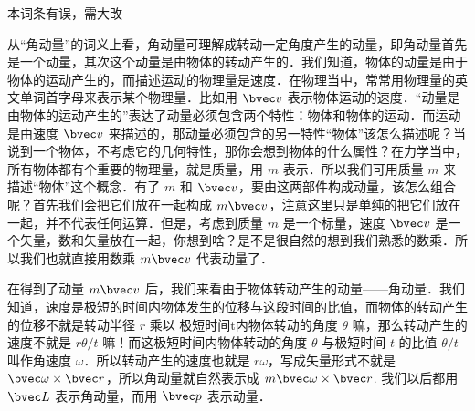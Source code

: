 
\begin{issues}
本词条有误，需大改
\end{issues}

从“角动量”的词义上看，角动量可理解成转动一定角度产生的动量，即角动量首先是一个动量，其次这个动量是由物体的转动产生的．我们知道，物体的动量是由于物体的运动产生的，而描述运动的物理量是速度．在物理当中，常常用物理量的英文单词首字母来表示某个物理量．比如用 $\bvec v$ 表示物体运动的速度．“动量是由物体的运动产生的”表达了动量必须包含两个特性：物体和物体的运动．而运动是由速度 $\bvec v$ 来描述的，那动量必须包含的另一特性“物体”该怎么描述呢？当说到一个物体，不考虑它的几何特性，那你会想到物体的什么属性？在力学当中，所有物体都有个重要的物理量，就是质量，用 $m$ 表示．所以我们可用质量 $m$ 来描述“物体”这个概念．有了 $m$ 和 $\bvec v$，要由这两部件构成动量，该怎么组合呢？首先我们会把它们放在一起构成 $m\bvec v$，注意这里只是单纯的把它们放在一起，并不代表任何运算．但是，考虑到质量 $m$ 是一个标量，速度 $\bvec v$ 是一个矢量，数和矢量放在一起，你想到啥？是不是很自然的想到我们熟悉的数乘．所以我们也就直接用数乘 $m\bvec v$ 代表动量了．

在得到了动量 $m\bvec v$ 后，我们来看由于物体转动产生的动量——角动量．我们知道，速度是极短的时间内物体发生的位移与这段时间的比值，而物体的转动产生的位移不就是转动半径 $r$ 乘以 极短时间t内物体转动的角度 $\theta$ 嘛，那么转动产生的速度不就是 $r\theta/t$ 嘛！而这极短时间内物体转动的角度 $\theta$ 与极短时间 $t$ 的比值 $\theta/t$ 叫作角速度 $\omega$．所以转动产生的速度也就是 $r\omega$，写成矢量形式不就是 $\bvec \omega\times \bvec r$，所以角动量就自然表示成 $m\bvec \omega\times \bvec r$. 我们以后都用 $\bvec L$ 表示角动量，而用 $\bvec p$ 表示动量．
